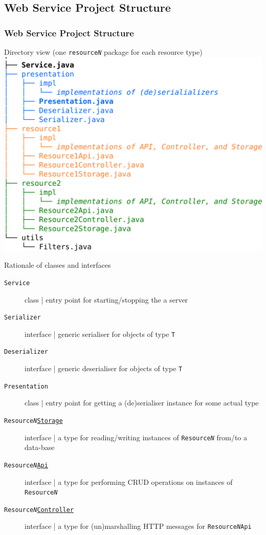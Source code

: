 \documentclass[presentation]{beamer}\mode<presentation>{\usetheme{AMSCesenaPurpleAndGold}}
\begin{document}
\subsection{Web Service Project Structure}

\begin{frame}[allowframebreaks]\frametitle{Web Service Project Structure}
    \begin{block}{Directory view (one \texttt{resource\textit{N}} package for each resource type)}\centering
        \includegraphics[width=.67\linewidth]{./img/ws-structure.pdf}
    \end{block}

    \begin{block}{Rationale of classes and interfaces}
        \begin{description}
            \item[\texttt{Service}] class | entry point for starting/stopping the a server
            \item[\texttt{Serializer}] interface | generic serialiser for objects of type \texttt{T}
            \item[\texttt{Deserializer}] interface | generic deserialiser for objects of type \texttt{T} 
            \item[\texttt{Presentation}] class | entry point for getting a (de)serialiser instance for some actual type 
            \item[\texttt{Resource\textit{N}\underline{Storage}}] interface | a type for reading/writing instances of \texttt{Resource\textit{N}} from/to a data-base
            \item[\texttt{Resource\textit{N}\underline{Api}}] interface | a type for performing CRUD operations on instances of \texttt{Resource\textit{N}}
            \item[\texttt{Resource\textit{N}\underline{Controller}}] interface | a type for (un)marshalling HTTP messages for \texttt{Resource\textit{N}Api}
        \end{description}
    \end{block}


\end{frame}
\end{document}
